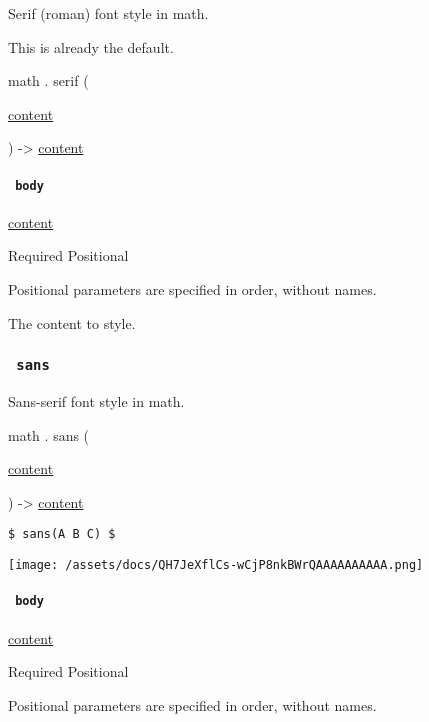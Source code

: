 Serif (roman) font style in math.

This is already the default.

math { . } { serif } (

{ \href{/docs/reference/foundations/content/}{content} }

) -\textgreater{} \href{/docs/reference/foundations/content/}{content}

\paragraph{\texorpdfstring{\texttt{\ body\ }}{ body }}\label{functions-serif-body}

\href{/docs/reference/foundations/content/}{content}

{Required} {{ Positional }}

\label{functions-serif-body-positional-tooltip}
Positional parameters are specified in order, without names.

The content to style.

\subsubsection{\texorpdfstring{\texttt{\ sans\ }}{ sans }}\label{functions-sans}

Sans-serif font style in math.

math { . } { sans } (

{ \href{/docs/reference/foundations/content/}{content} }

) -\textgreater{} \href{/docs/reference/foundations/content/}{content}

\begin{verbatim}
$ sans(A B C) $
\end{verbatim}

\texttt{[image: /assets/docs/QH7JeXflCs-wCjP8nkBWrQAAAAAAAAAA.png]}

\paragraph{\texorpdfstring{\texttt{\ body\ }}{ body }}\label{functions-sans-body}

\href{/docs/reference/foundations/content/}{content}

{Required} {{ Positional }}

\label{functions-sans-body-positional-tooltip}
Positional parameters are specified in order, without names.

